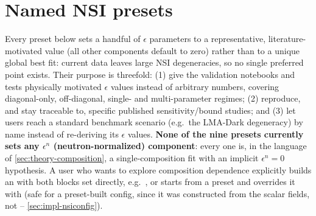 \label{ch:nsi-observables}

\section{Named NSI presets}
\label{sec:presets-table}


\begin{implbox}
Every preset below sets a handful of $\epsilon$ parameters to a
representative, literature-motivated value (all other components default to
zero) rather than to a unique global best fit: current data leaves large NSI
degeneracies, so no single preferred point exists. Their purpose is
threefold: (1) give the validation notebooks and tests physically motivated
$\epsilon$ values instead of arbitrary numbers, covering diagonal-only,
off-diagonal, single- and multi-parameter regimes; (2) reproduce, and stay
traceable to, specific published sensitivity/bound studies; and (3) let
users reach a standard benchmark scenario (e.g.\ the LMA-Dark degeneracy) by
name instead of re-deriving its $\epsilon$ values. \textbf{None of the nine
presets currently sets any $\epsilon^n$ (neutron-normalized) component}: every
one is, in the language of \cref{sec:theory-composition}, a single-composition
fit with an implicit $\epsilon^n=0$ hypothesis. A user who wants to explore
composition dependence explicitly builds an  with both
blocks set directly, e.g.\ , or
starts from a preset and overrides it with  (safe
for a preset-built config, since it was constructed from the scalar fields,
not  -- \cref{sec:impl-nsiconfig}).


\end{implbox}
